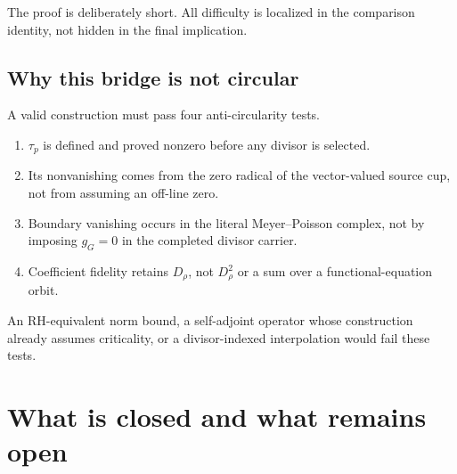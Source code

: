 \documentclass[11pt]{article}
\theoremstyle{definition}
\theoremstyle{remark}
\numberwithin{equation}{section}
\begin{document}
The proof is deliberately short.  All difficulty is localized in the
comparison identity, not hidden in the final implication.

\subsection{Why this bridge is not circular}

A valid construction must pass four anti-circularity tests.
\begin{enumerate}
\item $\tau_p$ is defined and proved nonzero before any divisor is selected.
\item Its nonvanishing comes from the zero radical of the vector-valued
source cup, not from assuming an off-line zero.
\item Boundary vanishing occurs in the literal Meyer--Poisson complex, not
by imposing $g_G=0$ in the completed divisor carrier.
\item Coefficient fidelity retains $D_\rho$, not $D_\rho^2$ or a sum over a
functional-equation orbit.
\end{enumerate}
An RH-equivalent norm bound, a self-adjoint operator whose construction
already assumes criticality, or a divisor-indexed interpolation would fail
these tests.

\section{What is closed and what remains open}
\end{document}
